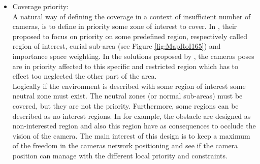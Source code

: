 \begin{itemize}
\begin{figure}[t!]
  \caption{  the path to cover is illustrate in the work of nikolaidis et al \cite{81*nikolaidis2009}. The are a small room is focused on cover a road (walk path) by using 3 cameras. }\label{fig:pathToCover81}
  \endminipage\hfill
\end{figure}
   The coverage problem may be reduced as a series of paths commonly borrowed by the users (car, pedestrian, …). When the area to cover is a well-known place the path of the users can be deduced \cite{27*bodor2005} or if the area to cover is a road the trajectory of the driver is knew \cite{14*lu2011}.  In this condition, the aim is to cover the common path of the user as presented in  \cite{14*lu2011,27*bodor2005,30*bodor2005,81*nikolaidis2009} (see the Figure \ref{fig:pathToCover81}). The path coverage is interesting due to this numerous restriction on the area to cover. Thanks to the restriction the coverage may became easier. Otherwise the path coverage introduce an important element is the zone with has a priority. This restricted zone in the area have to be the only area taking in account or  at least  the area  cover in priority.\\
   \item Coverage priority: \\
   A natural way of defining the coverage in a context of insufficient number of cameras, is to define in priority some zone of interest to cover.
    In \cite{84*xu2011,165*jiang2010,171*horster2006}, their proposed to focus on priority on some predefined region, respectively called region of interest, curial sub-area (see Figure \ref{fig:MapRoI165}) and importance space weighting.  In the solutions proposed  by \cite{84*xu2011,165*jiang2010,171*horster2006}, the cameras poses are in priority affected to this specific and restricted region which has to effect too neglected the other part of the area. \\
Logically if the environment is described with some region of interest some neutral zone must exist. The neutral zones (or normal sub-areas) must be covered, but they are not the priority. Furthermore, some regions can be described as no interest regions. In \cite{165*jiang2010,171*horster2006}  for example, the obstacle are designed as non-interested region and also this region have as consequences to occlude the vision of the camera. The main interest of this design is to keep a maximum of the freedom in the cameras network positioning and see if the camera position can manage with the different local priority and constraints.\\

\end{itemize}
